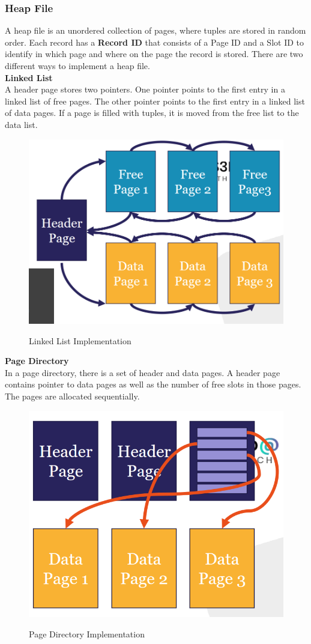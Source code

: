 \subsubsection{Heap File}
A heap file is an unordered collection of pages, where tuples are stored in random order. Each record has a \textbf{Record ID} that consists of a Page ID and a Slot ID to identify in which page and where on the page the record is stored. There are two different ways to implement a heap file.\vspace{.3cm}\\
\textbf{Linked List}\\
A header page stores two pointers. One pointer points to the first entry in a linked list of free pages. The other pointer points to the first entry in a linked list of data pages. If a page is filled with tuples, it is moved from the free list to the data list.
\begin{figure}[H]
\centering
\includegraphics[width=.5\textwidth]{images/linked_list.PNG}
\label{linked_list}
\caption{Linked List Implementation}
\end{figure}
\textbf{Page Directory}\\
In a page directory, there is a set of header and data pages. A header page contains pointer to data pages as well as the number of free slots in those pages. The pages are allocated sequentially.
\begin{figure}[H]
\centering
\includegraphics[width=.5\textwidth]{images/page_directory.PNG}
\label{page_directory}
\caption{Page Directory Implementation}
\end{figure}
